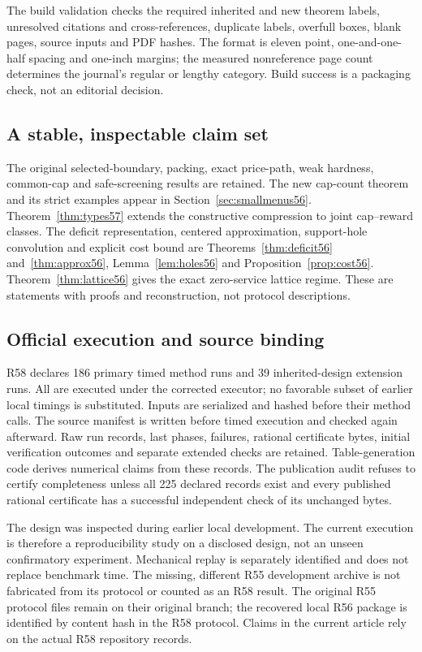 The build validation checks the required inherited and new theorem labels, unresolved citations and cross-references, duplicate labels, overfull boxes, blank pages, source inputs and PDF hashes. The format is eleven point, one-and-one-half spacing and one-inch margins; the measured nonreference page count determines the journal's regular or lengthy category. Build success is a packaging check, not an editorial decision.

\subsection{A stable, inspectable claim set}
The original selected-boundary, packing, exact price-path, weak hardness, common-cap and safe-screening results are retained. The new cap-count theorem and its strict examples appear in Section~\ref{sec:smallmenus56}. Theorem~\ref{thm:types57} extends the constructive compression to joint cap--reward classes. The deficit representation, centered approximation, support-hole convolution and explicit cost bound are Theorems~\ref{thm:deficit56} and~\ref{thm:approx56}, Lemma~\ref{lem:holes56} and Proposition~\ref{prop:cost56}. Theorem~\ref{thm:lattice56} gives the exact zero-service lattice regime. These are statements with proofs and reconstruction, not protocol descriptions.

\subsection{Official execution and source binding}
R58 declares 186 primary timed method runs and 39 inherited-design extension runs. All are executed under the corrected executor; no favorable subset of earlier local timings is substituted. Inputs are serialized and hashed before their method calls. The source manifest is written before timed execution and checked again afterward. Raw run records, last phases, failures, rational certificate bytes, initial verification outcomes and separate extended checks are retained. Table-generation code derives numerical claims from these records. The publication audit refuses to certify completeness unless all 225 declared records exist and every published rational certificate has a successful independent check of its unchanged bytes.

The design was inspected during earlier local development. The current execution is therefore a reproducibility study on a disclosed design, not an unseen confirmatory experiment. Mechanical replay is separately identified and does not replace benchmark time. The missing, different R55 development archive is not fabricated from its protocol or counted as an R58 result. The original R55 protocol files remain on their original branch; the recovered local R56 package is identified by content hash in the R58 protocol. Claims in the current article rely on the actual R58 repository records.

